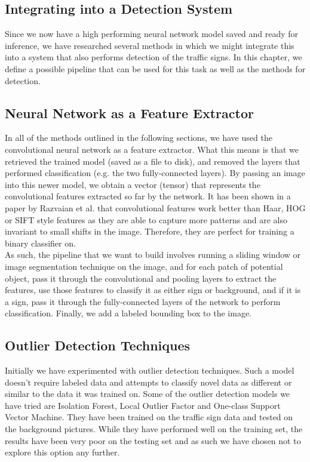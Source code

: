 \begin{center}
\chapter{Integrating into a Detection System}
\end{center}

Since we now have a high performing neural network model saved and ready for inference, we have researched several methods in which we might integrate this into a system that also performs detection of the traffic signs. In this chapter, we define a possible pipeline that can be used for this task as well as the methods for detection.\\

\section{Neural Network as a Feature Extractor}
In all of the methods outlined in the following sections, we have used the convolutional neural network as a feature extractor. What this means is that we retrieved the trained model (saved as a file to disk), and removed the layers that performed classification (e.g. the two fully-connected layers). By passing an image into this newer model, we obtain a vector (tensor) that represents the convolutional features extracted so far by the network. It has been shown in a paper by Razvaian et al.\cite{cnnFeatureExtraction} that convolutional features work better than Haar, HOG or SIFT style features as they are able to capture more patterns and are also invariant to small shifts in the image. Therefore, they are perfect for training a binary classifier on.\\
As such, the pipeline that we want to build involves running a sliding window or image segmentation technique on the image, and for each patch of potential object, pass it through the convolutional and pooling layers to extract the features, use those features to classify it as either sign or background, and if it is a sign, pass it through the fully-connected layers of the network to perform classification. Finally, we add a labeled bounding box to the image.

\section{Outlier Detection Techniques}
Initially we have experimented with outlier detection techniques. Such a model doesn't require labeled data and attempts to classify novel data as different or similar to the data it was trained on. Some of the outlier detection models we have tried are Isolation Forest, Local Outlier Factor and One-class Support Vector Machine. They have been trained on the traffic sign data and tested on the background pictures. While they have performed well on the training set, the results have been very poor on the testing set and as such we have chosen not to explore this option any further.

